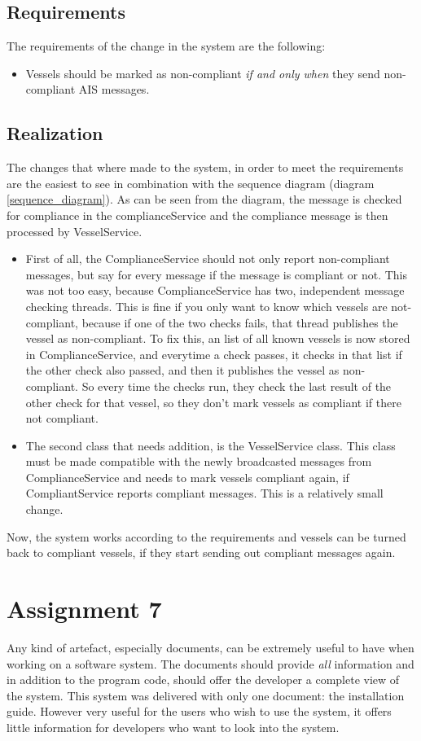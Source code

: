 \documentclass[12pt]{article}
\begin{document}
\subsection*{Requirements}
The requirements of the change in the system are the following:
\begin{itemize}
\item Vessels should be marked as non-compliant \emph{if and only when} they send non-compliant AIS messages.
\end{itemize}

\subsection*{Realization}
The changes that where made to the system, in order to meet the requirements are the easiest to see in combination with the sequence diagram (diagram \ref{sequence_diagram}). As can be seen from the diagram, the message is checked for compliance in the complianceService and the compliance message is then processed by VesselService.
\begin{itemize}
\item First of all, the ComplianceService should not only report non-compliant messages, but say for every message if the message is compliant or not. This was not too easy, because ComplianceService has two, independent message checking threads. This is fine if you only want to know which vessels are not-compliant, because if one of the two checks fails, that thread publishes the vessel as non-compliant. To fix this, an list of all known vessels is now stored in ComplianceService, and everytime a check passes, it checks in that list if the other check also passed, and then it publishes the vessel as non-compliant. So every time the checks run, they check the last result of the other check for that vessel, so they don't mark vessels as compliant if there not compliant.
\item The second class that needs addition, is the VesselService class. This class must be made compatible with the newly broadcasted messages from ComplianceService and needs to mark vessels compliant again, if CompliantService reports compliant messages. This is a relatively small change.
\end{itemize}

Now, the system works according to the requirements and vessels can be turned back to compliant vessels, if they start sending out compliant messages again.

\section*{Assignment 7}
Any kind of artefact, especially documents, can be extremely useful to have when working on a software system. The documents should provide \emph{all} information and in addition to the program code, should offer the developer a complete view of the system. This system was delivered with only one document: the installation guide. However very useful for the users who wish to use the system, it offers little information for developers who want to look into the system.
\end{document}
